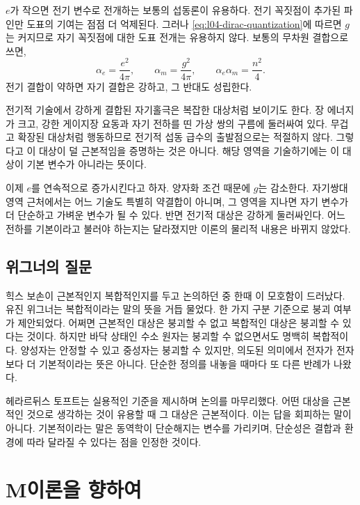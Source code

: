 \(e\)가 작으면 전기 변수로 전개하는 보통의 섭동론이 유용하다. 전기 꼭짓점이 추가된 파인만 도표의 기여는 점점 더 억제된다. 그러나 \eqref{eq:l04-dirac-quantization}에 따르면 \(g\)는 커지므로 자기 꼭짓점에 대한 도표 전개는 유용하지 않다. 보통의 무차원 결합으로 쓰면,
\begin{equation}
  \alpha_e=\frac{e^2}{4\pi},
  \qquad
  \alpha_m=\frac{g^2}{4\pi},
  \qquad
  \alpha_e\alpha_m=\frac{n^2}{4}.
  \label{eq:l04-dual-couplings}
\end{equation}
전기 결합이 약하면 자기 결합은 강하고, 그 반대도 성립한다.

전기적 기술에서 강하게 결합된 자기홀극은 복잡한 대상처럼 보이기도 한다. 장 에너지가 크고, 강한 게이지장 요동과 자기 전하를 띤 가상 쌍의 구름에 둘러싸여 있다. 무겁고 확장된 대상처럼 행동하므로 전기적 섭동 급수의 출발점으로는 적절하지 않다. 그렇다고 이 대상이 덜 근본적임을 증명하는 것은 아니다. 해당 영역을 기술하기에는 이 대상이 기본 변수가 아니라는 뜻이다.

이제 \(e\)를 연속적으로 증가시킨다고 하자. 양자화 조건 때문에 \(g\)는 감소한다. 자기쌍대 영역 근처에서는 어느 기술도 특별히 약결합이 아니며, 그 영역을 지나면 자기 변수가 더 단순하고 가벼운 변수가 될 수 있다. 반면 전기적 대상은 강하게 둘러싸인다. 어느 전하를 기본이라고 불러야 하는지는 달라졌지만 이론의 물리적 내용은 바뀌지 않았다.

\subsection{위그너의 질문}

힉스 보손이 근본적인지 복합적인지를 두고 논의하던 중 한때 이 모호함이 드러났다. 유진 위그너는 복합적이라는 말의 뜻을 거듭 물었다. 한 가지 구분 기준으로 붕괴 여부가 제안되었다. 어쩌면 근본적인 대상은 붕괴할 수 없고 복합적인 대상은 붕괴할 수 있다는 것이다. 하지만 바닥 상태인 수소 원자는 붕괴할 수 없으면서도 명백히 복합적이다. 양성자는 안정할 수 있고 중성자는 붕괴할 수 있지만, 의도된 의미에서 전자가 전자보다 더 기본적이라는 뜻은 아니다. 단순한 정의를 내놓을 때마다 또 다른 반례가 나왔다.

헤라르뒤스 토프트는 실용적인 기준을 제시하며 논의를 마무리했다. 어떤 대상을 근본적인 것으로 생각하는 것이 유용할 때 그 대상은 근본적이다. 이는 답을 회피하는 말이 아니다. 기본적이라는 말은 동역학이 단순해지는 변수를 가리키며, 단순성은 결합과 환경에 따라 달라질 수 있다는 점을 인정한 것이다.

\section{M이론을 향하여}

